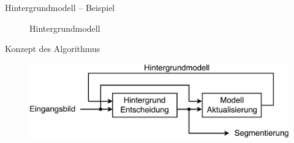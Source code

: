 \documentclass[hyperref={pdfpagelabels=false}]{beamer}
\begin{document}
\begin{frame}[t]{Hintergrundmodell -- Beispiel}
\begin{figure}
\begin{minipage}{0.45\linewidth}
			\caption*{Hintergrundmodell}
		\end{minipage}
	\end{figure}
\end{frame}



\begin{frame}[t]{Konzept des Algorithmus}
	\bigskip
	\bigskip
	\bigskip 
	\begin{figure}
		\centering
		\includegraphics[width=1\linewidth]{Abbildungen/gesamt.pdf}
		\label{fig:Abbildungen/Grid}
	\end{figure}
\end{frame}
\end{document}
